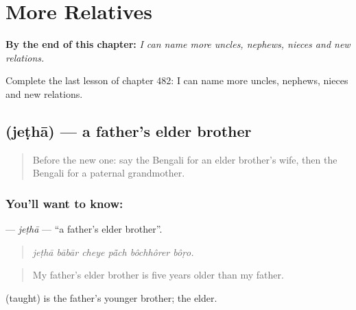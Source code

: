 
\chapter{More Relatives}
\label{ch:bn-more-relatives}

\begin{chapteropening}
\textbf{By the end of this chapter:} \emph{I can name more uncles, nephews, nieces and new relations.}

Complete the last lesson of chapter 482: I can name more uncles, nephews, nieces and new relations.
\end{chapteropening}

\section[\texorpdfstring{\bn{জেঠা} (jeṭhā)}{জেঠা (jeṭhā)}]{ (jeṭhā) — a father's elder brother}

\label{lesson:BN-C482-jetha}



\begin{quote}
Before the new one: say the Bengali for an elder brother's wife, then the Bengali for a paternal grandmother.
\end{quote}

\subsection*{You'll want to know: }
\textbf{} — \emph{jeṭhā} — \textquotedblleft{}a father's elder brother\textquotedblright{}.

\begin{quote}
     
\end{quote}

\begin{quote}
\emph{jeṭhā bābār cheye pā̃ch bôchhôrer bôṛo.}
\end{quote}

\begin{quote}
My father's elder brother is five years older than my father.
\end{quote}

 (taught) is the father's younger brother;  the elder.

